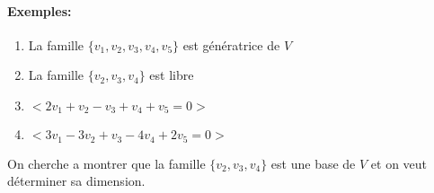 \documentclass[
    11pt,
    a4paper,
    oneside,
    headinlcude, footinclude,
    twoside,
]{report}
\begin{document}
\paragraph{Exemples:}

\begin{enumerate}
    \item La famille $\{v_{1}, v_{2}, v_{3}, v_{4}, v_{5}\}$ est génératrice
        de $V$

    \item La famille $\{v_{2}, v_{3}, v_{4}\}$ est libre

    \item $< 2 v_{1} + v_{2} - v_{3} + v_{4} + v_{5} = 0>$

    \item $< 3 v_{1} -3 v_{2} + v_{3} - 4 v_{4} + 2v_{5} = 0>$
\end{enumerate}

On cherche a montrer que la famille $\{v_{2}, v_{3}, v_{4}\}$ est une base de
$V$ et on veut déterminer sa dimension.
\end{document}

